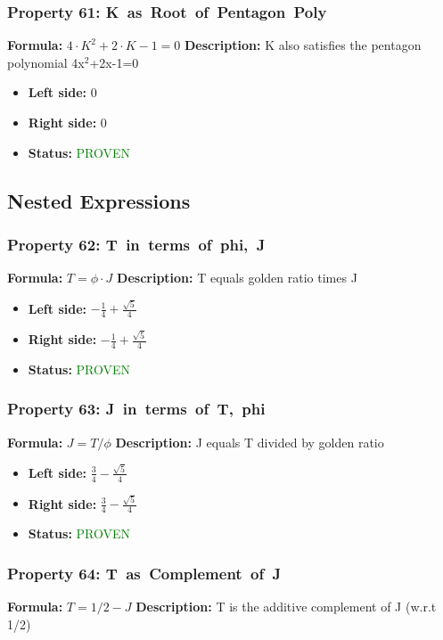 \subsubsection*{Property 61: K~as~Root~of~Pentagon~Poly}
\textbf{Formula:} $4 \cdot K^2 + 2 \cdot K - 1 = 0$
\textbf{Description:} K also satisfies the pentagon polynomial 4x$^2$+2x-1=0

\begin{itemize}
\item \textbf{Left side:} $0$
\item \textbf{Right side:} $0$
\item \textbf{Status:} \textcolor{green}{PROVEN}
\end{itemize}


\subsection{Nested Expressions}

\subsubsection*{Property 62: T~in~terms~of~phi,~J}
\textbf{Formula:} $T = \phi \cdot J$
\textbf{Description:} T equals golden ratio times J

\begin{itemize}
\item \textbf{Left side:} $- \frac{1}{4} + \frac{\sqrt{5}}{4}$
\item \textbf{Right side:} $- \frac{1}{4} + \frac{\sqrt{5}}{4}$
\item \textbf{Status:} \textcolor{green}{PROVEN}
\end{itemize}

\subsubsection*{Property 63: J~in~terms~of~T,~phi}
\textbf{Formula:} $J = T/\phi$
\textbf{Description:} J equals T divided by golden ratio

\begin{itemize}
\item \textbf{Left side:} $\frac{3}{4} - \frac{\sqrt{5}}{4}$
\item \textbf{Right side:} $\frac{3}{4} - \frac{\sqrt{5}}{4}$
\item \textbf{Status:} \textcolor{green}{PROVEN}
\end{itemize}

\subsubsection*{Property 64: T~as~Complement~of~J}
\textbf{Formula:} $T = 1/2 - J$
\textbf{Description:} T is the additive complement of J (w.r.t 1/2)


